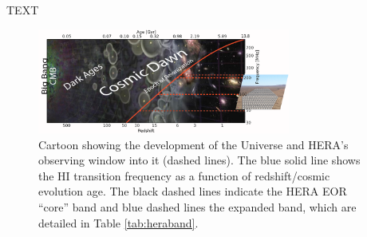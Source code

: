 \documentclass[ars]{copernicus}
\def\HI{{H{\small I }}}
\begin{document}
\begin{acknowledgements}
TEXT
\end{acknowledgements}










\begin{figure}[t]
\includegraphics[width=8.3cm]{plots/herauniall.png}
\caption{\small Cartoon showing the development of the Universe and HERA's observing window into it (dashed lines).  The blue solid
line shows the \HI transition frequency as a function of redshift/cosmic evolution age.  The black dashed lines indicate the HERA EOR ``core'' band and blue dashed lines the expanded band, which are detailed in Table \ref{tab:heraband}.}
\label{fig:theUniverse}
\end{figure}
\end{document}
